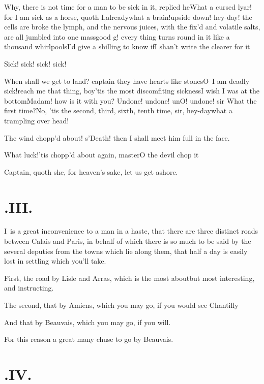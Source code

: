 \documentclass{article}
\begin{document}
Why, there is not time for a man to be\break
sick in it, replied he\tsh What a cursed\break
lyar! for I am sick as a horse, quoth I,\break already\tsh what a brain!\tsh upside down!\tsh
hey-day! the cells are broke  the lymph,
and the nervous juices, with the fix’d and volatile salts, are all jumbled into one
mass\tsh good \hbox{g\tsk!} every thing turns round in it like a thousand whirl\-pools\tsh I’d
give a shilling to know if\break I shan’t write the clearer for it\tsh

Sick! sick! sick! sick!\tsh

\newpage
\tsk When shall we get to land? captain\break
\tsk they have hearts like stones\tsh O~I\break
am deadly sick!\tsh reach me that thing, boy\tsh ’tis the most discomfiting sickness\tsh I wish I
was at the bottom\tsk Madam! how is it with you? Undone! undone! un\tsh O! undone!  sir
\tsh What the first time?\tsh No, ’tis the second, third, sixth, tenth time, sir,\tsh
hey-day\tsk what a trampling over head!\break
{}

The wind chopp’d about! s’Death!\tsk\break
then I shall meet him full in the face.

What luck!\tsk ’tis chopp’d about again, master\tsh O the devil chop it\tsh

Captain, quoth she, for heaven’s sake, let us get ashore.

\newpage
\section{.\enspace III.}

\lettrine{I}{\,} is a great inconvenience to a man in a haste, that there are three
distinct roads between Calais and Paris, in behalf of which there
is so much to be said by the several deputies from the towns which lie along them,
that half a day is easily lost in settling which you’ll take.

First, the road by Lisle and Arras, which is the
most about\tsh but most interesting, and instructing.

The second, that by Amiens, which you may go, if you
would see Chantilly\tsh

And that by Beauvais, which you may go, if you will.

\newpage
For this reason a great many chuse to go by Beauvais.

\section{.\enspace IV.}
\end{document}
